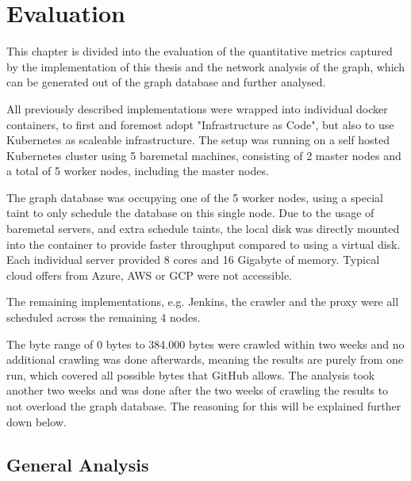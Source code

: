\chapter{Evaluation}

This chapter is divided into the evaluation of the quantitative metrics captured by the implementation of this thesis and the network analysis of the graph, which can be generated out of the graph database and further analysed.

All previously described implementations were wrapped into individual docker containers, to first and foremost adopt "Infrastructure as Code", but also to use Kubernetes as scaleable infrastructure. The setup was running on a self hosted Kubernetes cluster using 5 baremetal machines, consisting of 2 master nodes and a total of 5 worker nodes, including the master nodes.

The graph database was occupying one of the 5 worker nodes, using a special taint to only schedule the database on this single node. Due to the usage of baremetal servers, and extra schedule taints, the local disk was directly mounted into the container to provide faster throughput compared to using a virtual disk. Each individual server provided 8 cores and 16 Gigabyte of memory. Typical cloud offers from Azure, AWS or GCP were not accessible.

The remaining implementations, e.g. Jenkins, the crawler and the proxy were all scheduled across the remaining 4 nodes.

The byte range of 0 bytes to 384.000 bytes were crawled within two weeks and no additional crawling was done afterwards, meaning the results are purely from one run, which covered all possible bytes that GitHub allows. The analysis took another two weeks and was done after the two weeks of crawling the results to not overload the graph database. The reasoning for this will be explained further down below.

\section{General Analysis}

